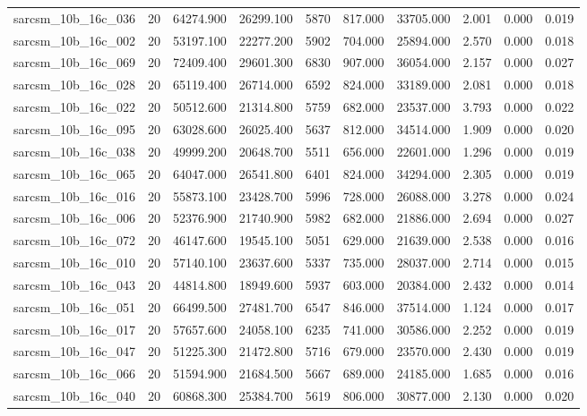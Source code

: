 \begin{tabular}{lrrrrrrrrr}
sarcsm\_10b\_16c\_036 & 20 & 64274.900 & 26299.100 & 5870 & 817.000 & 33705.000 & 2.001 & 0.000 & 0.019 \\
sarcsm\_10b\_16c\_002 & 20 & 53197.100 & 22277.200 & 5902 & 704.000 & 25894.000 & 2.570 & 0.000 & 0.018 \\
sarcsm\_10b\_16c\_069 & 20 & 72409.400 & 29601.300 & 6830 & 907.000 & 36054.000 & 2.157 & 0.000 & 0.027 \\
sarcsm\_10b\_16c\_028 & 20 & 65119.400 & 26714.000 & 6592 & 824.000 & 33189.000 & 2.081 & 0.000 & 0.018 \\
sarcsm\_10b\_16c\_022 & 20 & 50512.600 & 21314.800 & 5759 & 682.000 & 23537.000 & 3.793 & 0.000 & 0.022 \\
sarcsm\_10b\_16c\_095 & 20 & 63028.600 & 26025.400 & 5637 & 812.000 & 34514.000 & 1.909 & 0.000 & 0.020 \\
sarcsm\_10b\_16c\_038 & 20 & 49999.200 & 20648.700 & 5511 & 656.000 & 22601.000 & 1.296 & 0.000 & 0.019 \\
sarcsm\_10b\_16c\_065 & 20 & 64047.000 & 26541.800 & 6401 & 824.000 & 34294.000 & 2.305 & 0.000 & 0.019 \\
sarcsm\_10b\_16c\_016 & 20 & 55873.100 & 23428.700 & 5996 & 728.000 & 26088.000 & 3.278 & 0.000 & 0.024 \\
sarcsm\_10b\_16c\_006 & 20 & 52376.900 & 21740.900 & 5982 & 682.000 & 21886.000 & 2.694 & 0.000 & 0.027 \\
sarcsm\_10b\_16c\_072 & 20 & 46147.600 & 19545.100 & 5051 & 629.000 & 21639.000 & 2.538 & 0.000 & 0.016 \\
sarcsm\_10b\_16c\_010 & 20 & 57140.100 & 23637.600 & 5337 & 735.000 & 28037.000 & 2.714 & 0.000 & 0.015 \\
sarcsm\_10b\_16c\_043 & 20 & 44814.800 & 18949.600 & 5937 & 603.000 & 20384.000 & 2.432 & 0.000 & 0.014 \\
sarcsm\_10b\_16c\_051 & 20 & 66499.500 & 27481.700 & 6547 & 846.000 & 37514.000 & 1.124 & 0.000 & 0.017 \\
sarcsm\_10b\_16c\_017 & 20 & 57657.600 & 24058.100 & 6235 & 741.000 & 30586.000 & 2.252 & 0.000 & 0.019 \\
sarcsm\_10b\_16c\_047 & 20 & 51225.300 & 21472.800 & 5716 & 679.000 & 23570.000 & 2.430 & 0.000 & 0.019 \\
sarcsm\_10b\_16c\_066 & 20 & 51594.900 & 21684.500 & 5667 & 689.000 & 24185.000 & 1.685 & 0.000 & 0.016 \\
sarcsm\_10b\_16c\_040 & 20 & 60868.300 & 25384.700 & 5619 & 806.000 & 30877.000 & 2.130 & 0.000 & 0.020 \\

\end{tabular}
